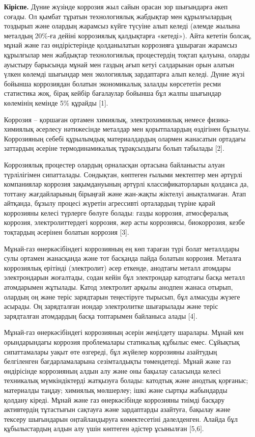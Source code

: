 {\bfseries Кіріспе.} Дүние жүзінде коррозия жыл сайын орасан зор шығындарға
әкеп соғады. Ол қымбат тұратын технологиялық жабдықтар мен құрылғылардың
тоздырып және олардың жарамсыз күйге түсуіне алып келеді (әлемде жылына
металдың 20\%-ға дейіні коррозиялық қалдықтарға «кетеді»). Айта кететін
болсақ, мұнай және газ өндірістерінде қолданылатын коррозияға ұшыраған
жарамсыз құрылғылар мен жабдықтар технологиялық процестердің тоқтап
қалуына, оларды ауыстыру барысында мұнай мен газдың ағып кетуі
салдарынан орын алатын үлкен көлемді шығындар мен экологиялық
зардаптарға алып келеді. Дүние жүзі бойынша коррозиядан болатын
экономикалық залалды көрсететін ресми статистика жоқ, бірақ кейбір
бағалаулар бойынша бұл жалпы шығындар көлемінің кемінде 5\% құрайды
{[}1{]}.

Коррозия -- қоршаған ортамен химиялық, электрохимиялық немесе
физика-химиялық әсерлесу нәтижесінде металдар мен қорытпалардың
өздігінен бұзылуы. Коррозияның себебі құрылымдық материалдардың олармен
жанасатын ортадағы заттардың әсеріне термодинамикалық тұрақсыздығы болып
табылады {[}2{]}.

Коррозиялық процестер олардың орналасқан ортасына байланысты алуан
түрлілігімен сипатталады. Сондықтан, көптеген ғылыми мектептер мен
әртүрлі компаниялар коррозия зақымдануының әртүрлі классификаторларын
қолданса да, тоттану жағдайларының бірыңғай және жан-жақты жіктелуі
анықталмаған. Атап айтқанда, бұзылу процесі жүретін агрессивті
орталардың түріне қарай коррозияны келесі түрлерге бөлуге болады: газды
коррозия, атмосфералық коррозия, электролиттердегі коррозия, жер асты
коррозиясы, биокоррозия, кезбе тоқтардың әсерінен болатын коррозия
{[}3{]}.

Мұнай-газ өнеркәсібіндегі коррозияның ең көп тараған түрі болат
металлдары сулы ортамен жанасқанда және тот басқанда пайда болатын
коррозия. Металға коррозиялық ерітінді (электролит) әсер еткенде,
анодтағы металл атомдары электрондарын жоғалтады, содан кейін бұл
электрондар катодтағы басқа металл атомдарымен жұтылады. Катод
электролит арқылы анодпен жанаса отырып, олардың оң және теріс
зарядтарын теңестіруге тырысып, бұл алмасуды жүзеге асырады. Оң
зарядталған иондар электролитке шығарылады және теріс зарядталған
атомдардың басқа топтарымен байланыса алады {[}4{]}.

Мұнай-газ өнеркәсібіндегі коррозияның әсерін жеңілдету шаралары. Мұнай
кен орындарындағы коррозия проблемалары статикалық құбылыс емес.
Сұйықтық сипаттамалары уақыт өте өзгереді, бұл жүйелер коррозияны
азайтудың белгіленген бағдарламаларына сезімталдықты төмендетеді. Мұнай
және газ өндірісінде коррозияның алдын алу және оны бақылау саласында
келесі техникалық мүмкіндіктерді жатқызуға болады: катодтық және анодтық
қорғаныс; материалды таңдау; химиялық мөлшерлеу; ішкі және сыртқы
жабындарды қолдану кіреді. Мұнай және газ өнеркәсібінде коррозияны
тиімді басқару активтердің тұтастығын сақтауға және зардаптарды
азайтуға, бақылау және тексеру шығындарын оңтайландыруға көмектесетіні
дәлелденген. Алайда бұл құбылыстардың алдын алу үшін көптеген әдістер
ұсынылған {[}5,6{]}.


